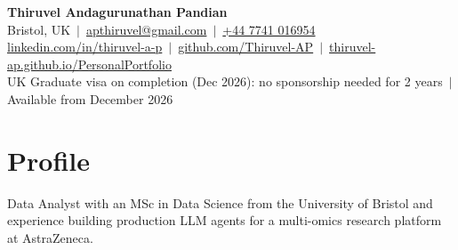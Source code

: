 \documentclass[a4paper,10pt]{article}
\begin{document}
\fontsize{10.5}{12.6}\selectfont

\begin{center}
  {\LARGE\bfseries Thiruvel Andagurunathan Pandian}\\[3pt]
  Bristol, UK \,$|$\, \href{mailto:apthiruvel@gmail.com}{apthiruvel@gmail.com} \,$|$\, \href{tel:+447741016954}{+44 7741 016954}\\[1pt]
\href{https://www.linkedin.com/in/thiruvel-a-p/}{linkedin.com/in/thiruvel-a-p} \,$|$\, \href{https://github.com/Thiruvel-AP}{github.com/Thiruvel-AP} \,$|$\, \href{https://thiruvel-ap.github.io/PersonalPortfolio/}{thiruvel-ap.github.io/PersonalPortfolio}\\[1pt]
  UK Graduate visa on completion (Dec 2026): no sponsorship needed for 2 years \,$|$\, Available from December 2026
\end{center}

\section{Profile}
Data Analyst with an MSc in Data Science from the University of Bristol and experience building production LLM agents for a multi-omics research platform at AstraZeneca.

\end{document}
